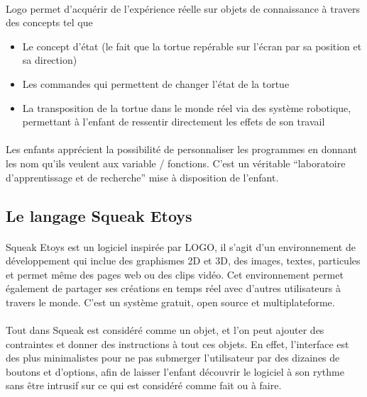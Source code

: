 \documentclass[a4paper]{article}
\begin{document}
\paragraph{}
Logo permet d’acquérir de l’expérience réelle sur objets de connaissance à travers des concepts tel que
\begin{itemize}
\item Le concept d’état (le fait que la tortue repérable sur l’écran par sa position et sa direction)
\item Les commandes qui permettent de changer l’état de la tortue
\item La transposition de la tortue dans le monde réel via des système robotique, permettant à l’enfant de ressentir directement les effets de son travail
\end{itemize}

\paragraph{}
Les enfants apprécient la possibilité de personnaliser les programmes en donnant les nom qu’ils veulent aux variable / fonctions. C’est un véritable “laboratoire d’apprentissage et de recherche” mise à disposition de l’enfant.

\subsection{Le langage Squeak Etoys}

\paragraph{}
Squeak Etoys \cite{kay2005squeak} est un logiciel inspirée par LOGO, il s’agit d’un environnement de développement qui inclue des graphismes 2D et 3D, des images, textes, particules et permet même des pages web ou des clips vidéo. Cet environnement permet également de partager ses créations en temps réel avec d’autres utilisateurs à travers le monde. C’est un système gratuit, open source et multiplateforme.

\paragraph{}
Tout dans Squeak est considéré comme un objet, et l’on peut ajouter des contraintes et donner des instructions à tout ces objets. En effet, l’interface est des plus minimalistes pour ne pas submerger l’utilisateur par des dizaines de boutons et d’options, afin de laisser l’enfant découvrir le logiciel à son rythme sans être intrusif sur ce qui est considéré comme fait ou à faire.
\end{document}
